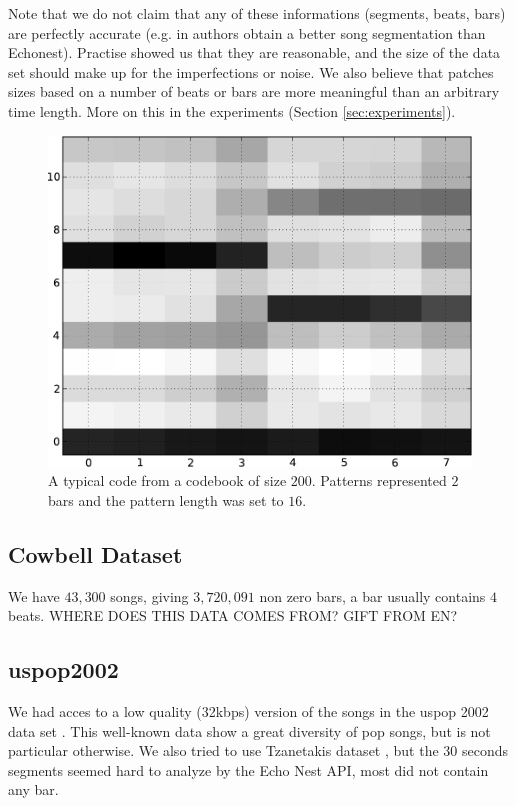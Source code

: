 \documentclass{article}
\begin{document}
Note that we do not claim that any of these informations (segments, beats, bars)
are perfectly accurate (e.g. in \cite{Barrington2009a} authors obtain a better
song segmentation than Echonest). Practise showed us that they are reasonable, 
and the size of the data set should make up for the imperfections or noise.
We also believe that patches sizes based on a number of beats or bars are more
meaningful than an arbitrary time length. More on this in the experiments
(Section \ref{sec:experiments}).


\begin{figure}[htb]
\begin{center}
\includegraphics[width=.8\columnwidth]{code}
\end{center}
\caption{{A typical code from a codebook of size $200$. Patterns represented
$2$ bars and the pattern length was set to $16$.}}
\label{fig:code}
\end{figure}

\subsection{Cowbell Dataset}
We have $43,300$ songs, giving  $3,720,091$ non zero bars, a bar usually 
contains $4$ beats. WHERE DOES THIS DATA COMES FROM? GIFT FROM EN?


\subsection{uspop2002}
We had acces to a low quality (32kbps) version of the songs in the uspop 2002 
data set \cite{uspop2002}.
This well-known data show a great diversity of pop songs, but is not particular
otherwise. We also tried to use Tzanetakis dataset \cite{Tzanetakis2002a}, but 
the $30$ seconds segments seemed hard to analyze by the Echo Nest API, most did
not contain any bar.
\end{document}

